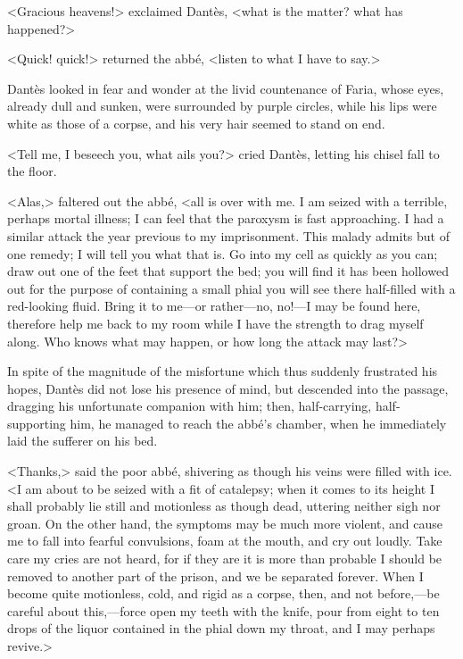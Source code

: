  <Gracious heavens!> exclaimed Dantès, <what is the matter? what has happened?> 

 <Quick! quick!> returned the abbé, <listen to what I have to say.> 

 Dantès looked in fear and wonder at the livid countenance of Faria, whose eyes, already dull and sunken, were surrounded by purple circles, while his lips were white as those of a corpse, and his very hair seemed to stand on end. 

 <Tell me, I beseech you, what ails you?> cried Dantès, letting his chisel fall to the floor. 

 <Alas,> faltered out the abbé, <all is over with me. I am seized with a terrible, perhaps mortal illness; I can feel that the paroxysm is fast approaching. I had a similar attack the year previous to my imprisonment. This malady admits but of one remedy; I will tell you what that is. Go into my cell as quickly as you can; draw out one of the feet that support the bed; you will find it has been hollowed out for the purpose of containing a small phial you will see there half-filled with a red-looking fluid. Bring it to me—or rather—no, no!—I may be found here, therefore help me back to my room while I have the strength to drag myself along. Who knows what may happen, or how long the attack may last?> 

 In spite of the magnitude of the misfortune which thus suddenly frustrated his hopes, Dantès did not lose his presence of mind, but descended into the passage, dragging his unfortunate companion with him; then, half-carrying, half-supporting him, he managed to reach the abbé's chamber, when he immediately laid the sufferer on his bed. 

 <Thanks,> said the poor abbé, shivering as though his veins were filled with ice. <I am about to be seized with a fit of catalepsy; when it comes to its height I shall probably lie still and motionless as though dead, uttering neither sigh nor groan. On the other hand, the symptoms may be much more violent, and cause me to fall into fearful convulsions, foam at the mouth, and cry out loudly. Take care my cries are not heard, for if they are it is more than probable I should be removed to another part of the prison, and we be separated forever. When I become quite motionless, cold, and rigid as a corpse, then, and not before,—be careful about this,—force open my teeth with the knife, pour from eight to ten drops of the liquor contained in the phial down my throat, and I may perhaps revive.> 

